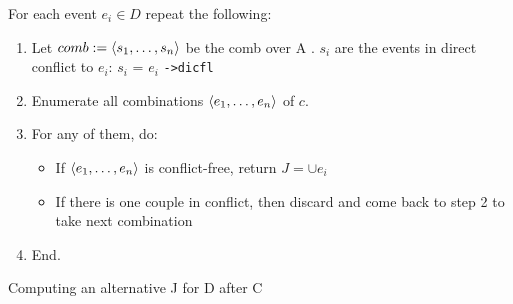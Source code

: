 \documentclass{llncs}
\begin{document}
\begin{algorithm}
\noindent
For each event $e_i \in D$ repeat the following:
\begin{enumerate}
\item
	Let $comb \mathrel{:=} \langle s_1, \ldots, s_n\rangle$ be the comb over A . 
	$s_i$ are the events in direct conflict to $e_i$: $s_i$ = $e_i$ \verb!->dicfl!

\item
	Enumerate all combinations $\langle e_1, \ldots, e_n\rangle$ of $c$.
\item
	For any of them, do:
	\begin{itemize}
		\item 
    		If $\langle e_1, \ldots, e_n\rangle$ is conflict-free, return $J = \cup e_i$ 
    	\item
		    If there is one couple in conflict, then discard and come back to step 2 to take next combination
	\end{itemize}
\item End.
\end{enumerate}
\caption{Computing an alternative J for D after C}
\label{a:alter}
\end{algorithm}
\end{document}
